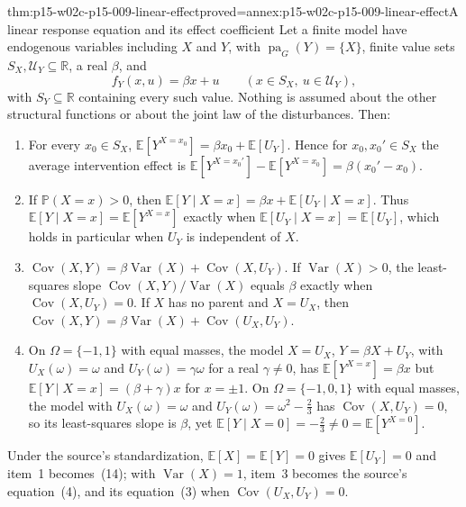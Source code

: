 \begin{hbtheorem}{thm:p15-w02c-p15-009-linear-effect}{proved=annex:p15-w02c-p15-009-linear-effect}{A linear response equation and its effect coefficient}
Let a finite model have endogenous variables including \(X\) and \(Y\),
with \(\operatorname{pa}_G(Y)=\{X\}\), finite value sets
\(S_X,\mathcal U_Y\subseteq\mathbb R\), a real \(\beta\), and
\[
 f_Y(x,u)=\beta x+u\qquad(x\in S_X,\ u\in\mathcal U_Y),
\]
with \(S_Y\subseteq\mathbb R\) containing every such value. Nothing is
assumed about the other structural functions or about the joint law of
the disturbances. Then:
\begin{enumerate}
\item For every \(x_0\in S_X\),
      \(\mathbb E[Y^{X=x_0}]=\beta x_0+\mathbb E[U_Y]\). Hence for
      \(x_0,x_0'\in S_X\) the average intervention effect is
      \(\mathbb E[Y^{X=x_0'}]-\mathbb E[Y^{X=x_0}]=\beta(x_0'-x_0)\).
\item If \(\mathbb P(X=x)>0\), then
      \(\mathbb E[Y\mid X=x]=\beta x+\mathbb E[U_Y\mid X=x]\). Thus
      \(\mathbb E[Y\mid X=x]=\mathbb E[Y^{X=x}]\) exactly when
      \(\mathbb E[U_Y\mid X=x]=\mathbb E[U_Y]\), which holds in
      particular when \(U_Y\) is independent of \(X\).
\item \(\operatorname{Cov}(X,Y)=\beta\operatorname{Var}(X)
      +\operatorname{Cov}(X,U_Y)\). If \(\operatorname{Var}(X)>0\), the
      least-squares slope \(\operatorname{Cov}(X,Y)/\operatorname{Var}(X)\)
      equals \(\beta\) exactly when \(\operatorname{Cov}(X,U_Y)=0\). If
      \(X\) has no parent and \(X=U_X\), then
      \(\operatorname{Cov}(X,Y)=\beta\operatorname{Var}(X)
      +\operatorname{Cov}(U_X,U_Y)\).
\item On \(\Omega=\{-1,1\}\) with equal masses, the model
      \(X=U_X\), \(Y=\beta X+U_Y\), with \(U_X(\omega)=\omega\) and
      \(U_Y(\omega)=\gamma\omega\) for a real \(\gamma\ne0\), has
      \(\mathbb E[Y^{X=x}]=\beta x\) but
      \(\mathbb E[Y\mid X=x]=(\beta+\gamma)x\) for \(x=\pm1\). On
      \(\Omega=\{-1,0,1\}\) with equal masses, the model with
      \(U_X(\omega)=\omega\) and \(U_Y(\omega)=\omega^2-\tfrac23\) has
      \(\operatorname{Cov}(X,U_Y)=0\), so its least-squares slope is
      \(\beta\), yet
      \(\mathbb E[Y\mid X=0]=-\tfrac23\ne0=\mathbb E[Y^{X=0}]\).
\end{enumerate}
Under the source's standardization, \(\mathbb E[X]=\mathbb E[Y]=0\)
gives \(\mathbb E[U_Y]=0\) and item~1 becomes~(14); with
\(\operatorname{Var}(X)=1\), item~3 becomes the source's
equation~(4), and its equation~(3) when \(\operatorname{Cov}(U_X,U_Y)=0\).
\end{hbtheorem}

